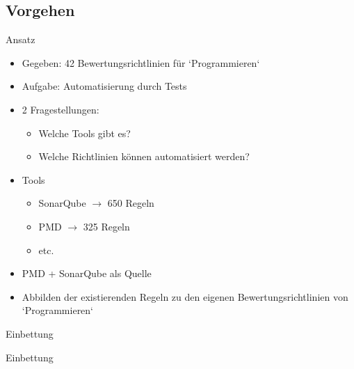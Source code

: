 \documentclass{sdqbeamer}
\begin{document}
\subsection{Vorgehen}
\begin{frame}{Ansatz}
	\begin{itemize}
		\item Gegeben: 42 Bewertungsrichtlinien für `Programmieren`          
            \item Aufgabe: Automatisierung durch Tests
            \pause
            \item 2 Fragestellungen: 
            \begin{itemize}
                \item Welche Tools gibt es?
                \item Welche Richtlinien können automatisiert werden?
            \end{itemize}
            \item Tools
            \begin{itemize}
                \item SonarQube $\rightarrow$ 650 Regeln
                \item PMD $\rightarrow$ 325 Regeln
                \item etc.
            \end{itemize}
            \pause
            \item PMD + SonarQube als Quelle
            \item Abbilden der existierenden Regeln zu den eigenen Bewertungsrichtlinien von `Programmieren`
	\end{itemize}
\end{frame}

\begin{frame}{Einbettung}
    \begin{center}
        \vspace{-1cm}
        \hspace{-0.6cm}
        
    \end{center}    
\end{frame}

\begin{frame}{Einbettung}
    \begin{center}
        \vspace{-0.85cm}
        \hspace{-0.35cm}
        
    \end{center}    
\end{frame}
\end{document}
